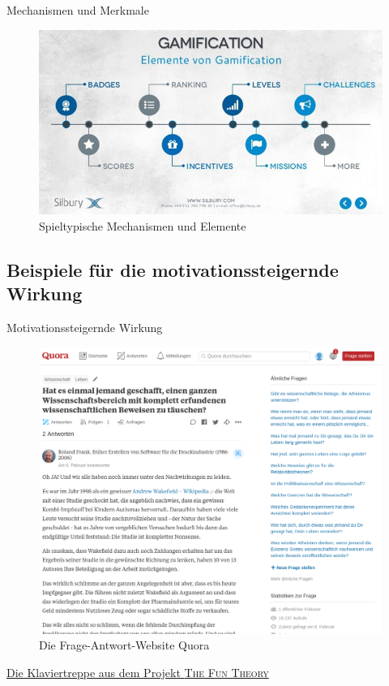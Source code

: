 \documentclass[hyphens]{beamer}
\begin{document}
\begin{frame}{Mechanismen und Merkmale}
\begin{figure}
	\includegraphics[scale=0.45]{pics/elements}
	\caption{Spieltypische Mechanismen und Elemente}
\end{figure}
\end{frame}

\subsection{Beispiele für die motivationssteigernde Wirkung}

\begin{frame}{Motivationssteigernde Wirkung}
\begin{figure}
	\includegraphics[scale=0.16]{pics/quora}
	\caption{Die Frage-Antwort-Website Quora}
\end{figure}
\centering \href{https://www.youtube.com/watch?v=SByymar3bds}{Die Klaviertreppe aus dem Projekt \textsc{The Fun Theory}}
\end{frame}
\end{document}

